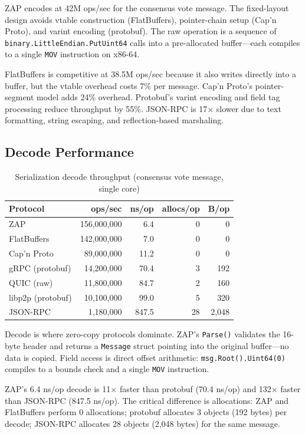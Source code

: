 \documentclass[11pt,letterpaper]{article}
\begin{document}
ZAP encodes at 42M ops/sec for the consensus vote message. The fixed-layout design avoids vtable construction (FlatBuffers), pointer-chain setup (Cap'n Proto), and varint encoding (protobuf). The raw operation is a sequence of \texttt{binary.LittleEndian.PutUint64} calls into a pre-allocated buffer---each compiles to a single \texttt{MOV} instruction on x86-64.

FlatBuffers is competitive at 38.5M ops/sec because it also writes directly into a buffer, but the vtable overhead costs 7\% per message. Cap'n Proto's pointer-segment model adds 24\% overhead. Protobuf's varint encoding and field tag processing reduce throughput by 55\%. JSON-RPC is 17$\times$ slower due to text formatting, string escaping, and reflection-based marshaling.

\subsection{Decode Performance}

\begin{table}[h]
\centering
\caption{Serialization decode throughput (consensus vote message, single core)}
\label{tab:decode}
\begin{tabular}{lrrrr}
\toprule
\textbf{Protocol} & \textbf{ops/sec} & \textbf{ns/op} & \textbf{allocs/op} & \textbf{B/op} \\
\midrule
\rowcolor{luxblue!10}
ZAP & 156,000,000 & 6.4 & 0 & 0 \\
FlatBuffers & 142,000,000 & 7.0 & 0 & 0 \\
Cap'n Proto & 89,000,000 & 11.2 & 0 & 0 \\
gRPC (protobuf) & 14,200,000 & 70.4 & 3 & 192 \\
QUIC (raw) & 11,800,000 & 84.7 & 2 & 160 \\
libp2p (protobuf) & 10,100,000 & 99.0 & 5 & 320 \\
JSON-RPC & 1,180,000 & 847.5 & 28 & 2,048 \\
\bottomrule
\end{tabular}
\end{table}

Decode is where zero-copy protocols dominate. ZAP's \texttt{Parse()} validates the 16-byte header and returns a \texttt{Message} struct pointing into the original buffer---no data is copied. Field access is direct offset arithmetic: \texttt{msg.Root().Uint64(0)} compiles to a bounds check and a single \texttt{MOV} instruction.

ZAP's 6.4 ns/op decode is 11$\times$ faster than protobuf (70.4 ns/op) and 132$\times$ faster than JSON-RPC (847.5 ns/op). The critical difference is allocations: ZAP and FlatBuffers perform 0 allocations; protobuf allocates 3 objects (192 bytes) per decode; JSON-RPC allocates 28 objects (2,048 bytes) for the same message.
\end{document}
